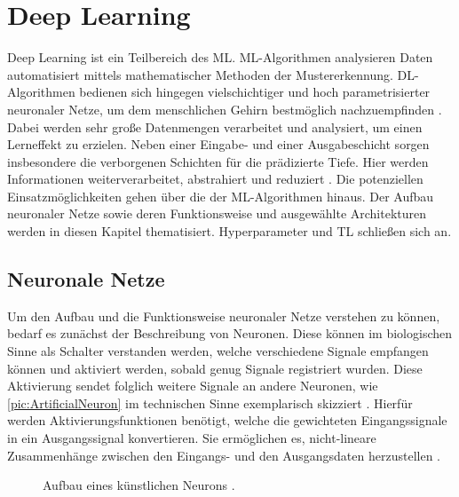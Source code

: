 \chapter{Deep Learning}
\thispagestyle{fancy}
\label{chap:Deep Learning}

\noindent
Deep Learning ist ein Teilbereich des \ac{ML}. \ac{ML}-Algorithmen analysieren Daten automatisiert mittels mathematischer Methoden der Mustererkennung. \ac{DL}-Algorithmen bedienen sich hingegen vielschichtiger und hoch parametrisierter neuronaler Netze, um dem menschlichen Gehirn bestmöglich nachzuempfinden \cite[S.~455-457]{KHA19}. Dabei werden sehr große Datenmengen verarbeitet und analysiert, um einen Lerneffekt zu erzielen. Neben einer Eingabe- und einer Ausgabeschicht sorgen insbesondere die verborgenen Schichten für die prädizierte Tiefe. Hier werden Informationen weiterverarbeitet, abstrahiert und reduziert \cite[S.~131]{ZHA20}. Die potenziellen Einsatzmöglichkeiten gehen über die der \ac{ML}-Algorithmen hinaus. Der Aufbau neuronaler Netze sowie deren Funktionsweise und ausgewählte Architekturen werden in diesen Kapitel thematisiert. Hyperparameter und \ac{TL} schließen sich an.


\section{Neuronale Netze}
\noindent
Um den Aufbau und die Funktionsweise neuronaler Netze verstehen zu können, bedarf es zunächst der Beschreibung von Neuronen. Diese können im biologischen Sinne als Schalter verstanden werden, welche verschiedene Signale empfangen können und aktiviert werden, sobald genug Signale registriert wurden. Diese Aktivierung sendet folglich weitere Signale an andere Neuronen, wie \autoref{pic:ArtificialNeuron} im technischen Sinne exemplarisch skizziert \cite[S.~42]{KRI05}. Hierfür werden Aktivierungsfunktionen benötigt, welche die gewichteten Eingangssignale in ein Ausgangssignal konvertieren. Sie ermöglichen es, nicht-lineare Zusammenhänge zwischen den Eingangs- und den Ausgangsdaten herzustellen \cite[S.~134]{ZHA20}.\\

\begin{figure}[h!]
  \centering
  \caption{Aufbau eines künstlichen Neurons \cite{MCC20}.}
  \label{pic:ArtificialNeuron}
\end{figure}

